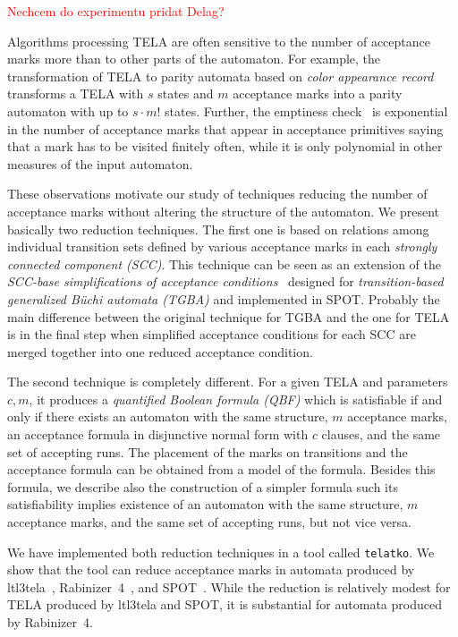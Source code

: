\documentclass[runningheads]{llncs}
\newcommand{\todo}[1]{\textcolor{red}{#1}}
\begin{document}
\todo{Nechcem do experimentu pridat Delag?}

Algorithms processing TELA are often sensitive to the number of
acceptance marks more than to other parts of the automaton. For
example, the transformation of TELA to parity automata based on
\emph{color appearance record}~\cite{renkin.20.atva} transforms a TELA
with $s$ states and $m$ acceptance marks into a parity automaton with
up to $s\cdot m!$ states. Further, the emptiness
check~\cite{baier.19.atva} is exponential in the number of acceptance
marks that appear in acceptance primitives saying that a mark has to
be visited finitely often, while it is only polynomial in other
measures of the input automaton.

These observations motivate our study of techniques reducing the
number of acceptance marks without altering the structure of the
automaton. We present basically two reduction techniques. The first
one is based on relations among individual transition sets defined by
various acceptance marks in each \emph{strongly connected component
  (SCC)}. This technique can be seen as an extension of the
\emph{SCC-base simplifications of acceptance
  conditions}~\cite{babiak.13.spin} designed for
\emph{transition-based generalized Büchi automata (TGBA)} and
implemented in SPOT. Probably the main difference between the original
technique for TGBA and the one for TELA is in the final step when
simplified acceptance conditions for each SCC are merged together into
one reduced acceptance condition.

The second technique is completely different. For a given TELA and
parameters $c,m$, it produces a \emph{quantified Boolean formula
  (QBF)} which is satisfiable if and only if there exists an automaton
with the same structure, $m$ acceptance marks, an acceptance formula
in disjunctive normal form with $c$ clauses, and the same set
of accepting runs. The placement of the marks on transitions and the
acceptance formula can be obtained from a model of the
formula. Besides this formula, we describe also the construction of a
simpler formula such its satisfiability implies existence of an
automaton with the same structure, $m$ acceptance marks, and the same
set of accepting runs, but not vice versa.

We have implemented both reduction techniques in a tool called
\texttt{telatko}. We show that the tool can reduce acceptance marks in
automata produced by ltl3tela~\cite{major.19.atva},
Rabinizer~4~\cite{kretinsky.18.cav}, and SPOT~\cite{duret.16.atva2}.
While the reduction is relatively modest for TELA produced by ltl3tela
and SPOT, it is substantial for automata produced by Rabinizer~4.
\end{document}
